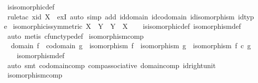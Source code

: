 \begin{isabellebody}
%
\isatagproof
{}\isamarkupfalse%
\ is{\isacharunderscore}{\kern0pt}isomorphic{\isacharunderscore}{\kern0pt}def\isanewline
\ \ \isamarkupfalse%
\ {\isacharparenleft}{\kern0pt}rule{\isacharunderscore}{\kern0pt}tac\ x{\isacharequal}{\kern0pt}{\isachardoublequoteopen}id\ X{\isachardoublequoteclose}\ \ exI{\isacharcomma}{\kern0pt}\ auto\ simp\ add{\isacharcolon}{\kern0pt}\ id{\isacharunderscore}{\kern0pt}domain\ id{\isacharunderscore}{\kern0pt}codomain\ id{\isacharunderscore}{\kern0pt}isomorphism\ id{\isacharunderscore}{\kern0pt}type{\isacharparenright}{\kern0pt}%
\endisatagproof
{\isafoldproof}%
%
\isadelimproof
\isanewline
%
\endisadelimproof
\isanewline
{}\isamarkupfalse%
\ isomorphic{\isacharunderscore}{\kern0pt}is{\isacharunderscore}{\kern0pt}symmetric{\isacharcolon}{\kern0pt}\ {\isachardoublequoteopen}X\ {\isasymcong}\ Y\ {\isasymlongrightarrow}\ Y\ {\isasymcong}\ X{\isachardoublequoteclose}\isanewline
%
\isadelimproof
\ \ %
\endisadelimproof
%
\isatagproof
{}\isamarkupfalse%
\ is{\isacharunderscore}{\kern0pt}isomorphic{\isacharunderscore}{\kern0pt}def\ isomorphism{\isacharunderscore}{\kern0pt}def\ \isanewline
\ \ \isamarkupfalse%
\ {\isacharparenleft}{\kern0pt}auto{\isacharcomma}{\kern0pt}\ metis\ cfunc{\isacharunderscore}{\kern0pt}type{\isacharunderscore}{\kern0pt}def{\isacharparenright}{\kern0pt}%
\endisatagproof
{\isafoldproof}%
%
\isadelimproof
\isanewline
%
\endisadelimproof
\isanewline
{}\isamarkupfalse%
\ isomorphism{\isacharunderscore}{\kern0pt}comp{\isacharcolon}{\kern0pt}\ \isanewline
\ \ {\isachardoublequoteopen}domain\ f\ {\isacharequal}{\kern0pt}\ codomain\ g\ {\isasymLongrightarrow}\ isomorphism\ f\ {\isasymLongrightarrow}\ isomorphism\ g\ {\isasymLongrightarrow}\ isomorphism\ {\isacharparenleft}{\kern0pt}f\ {\isasymcirc}\isactrlsub c\ g{\isacharparenright}{\kern0pt}{\isachardoublequoteclose}\isanewline
%
\isadelimproof
\ \ %
\endisadelimproof
%
\isatagproof
{}\isamarkupfalse%
\ isomorphism{\isacharunderscore}{\kern0pt}def\ \isamarkupfalse%
\ {\isacharparenleft}{\kern0pt}auto{\isacharcomma}{\kern0pt}\ smt\ codomain{\isacharunderscore}{\kern0pt}comp\ comp{\isacharunderscore}{\kern0pt}associative\ domain{\isacharunderscore}{\kern0pt}comp\ id{\isacharunderscore}{\kern0pt}right{\isacharunderscore}{\kern0pt}unit{\isacharparenright}{\kern0pt}%
\endisatagproof
{\isafoldproof}%
%
\isadelimproof
\isanewline
%
\endisadelimproof
\isanewline
{}\isamarkupfalse%
\ isomorphism{\isacharunderscore}{\kern0pt}comp{\isacharprime}{\kern0pt}{\isacharcolon}{\kern0pt}\ \isanewline

\end{isabellebody}

